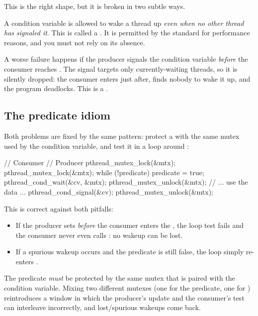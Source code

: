 This is the right shape, but it is broken in two subtle ways.

\begin{warningblock}
A condition variable is allowed to wake a thread up \emph{even when no other thread has signaled it}. This is called a . It is permitted by the standard for performance reasons, and you must not rely on its absence.

A worse failure happens if the producer signals the condition variable \emph{before} the consumer reaches . The signal targets only currently-waiting threads, so it is silently dropped: the consumer enters  just after, finds nobody to wake it up, and the program deadlocks. This is a .
\end{warningblock}

\subsection{The predicate idiom}

Both problems are fixed by the same pattern: protect a  with the same mutex used by the condition variable, and test it in a  loop around :

\begin{codeblock}[language=C]
// Consumer                                  // Producer
pthread_mutex_lock(&mtx);                    pthread_mutex_lock(&mtx);
while (!predicate)                           predicate = true;
    pthread_cond_wait(&cv, &mtx);            pthread_mutex_unlock(&mtx);
// ... use the data ...                      pthread_cond_signal(&cv);
pthread_mutex_unlock(&mtx);
\end{codeblock}

This is correct against both pitfalls:

\begin{itemize}[noitemsep]
    \item If the producer sets  \emph{before} the consumer enters the , the loop test fails and the consumer never even calls : no wakeup can be lost.
    \item If a spurious wakeup occurs and the predicate is still false, the loop simply re-enters .
\end{itemize}

\begin{tipsblock}
The predicate \emph{must} be protected by the same mutex that is paired with the condition variable. Mixing two different mutexes (one for the predicate, one for ) reintroduces a window in which the producer's update and the consumer's test can interleave incorrectly, and lost/spurious wakeups come back.
\end{tipsblock}

